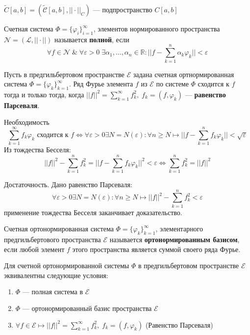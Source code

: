 $ \tilde{C}[a,b] = (\tilde{\mathcal{C}}[a,b], ||\cdot||_C) $ --- подпространство $ C[a,b] $
\begin{greyDefinition} Счетная система  $ \Phi = \{ \varphi_i\}^\infty_{i=1} $, элементов нормированного пространства $ \mathcal{N} = (\mathcal{L},||\cdot||)  $ называется \textbf{полной}, если 
\[
	\forall f \in \mathcal{N}\; \& \;\forall \varepsilon>0\; \exists\alpha_1,\ldots,\alpha_n \in \mathbb{R}: ||f-\sum_{k=1}^n \alpha_k\varphi_k || <\varepsilon
\]
\end{greyDefinition}
\begin{greyTheorem}
	Пусть в предгильбертовом пространстве $ \mathcal{E} $ задана счетная ортнормированная система $ \Phi = \{ \varphi_k \}^\infty_{k=1} $. Ряд Фурье элемента $ f $ из $ \mathcal{E} $ по системе $ \Phi $ сходится к $ f $ тогда и только тогда, когда $ ||f||^2 = \sum_{k=1}^\infty f_k^2,\; f_k = (f,\varphi_k) $ --- \textbf{равенство Парсеваля}.
\end{greyTheorem}
\begin{greyProof}
	Необходимость\[
		\sum_{k=1}^\infty f_k\varphi_k \text{ сходится к } f \Leftrightarrow \forall \varepsilon>0 \exists N=N(\varepsilon): \forall n \geqslant N \mapsto ||f-\sum_{k=1}^n f_k\varphi_k || < \sqrt{\varepsilon}
	\]
	Из тождества Бесселя:
		\[
	||f||^2 - \sum_{k=1}^n f_k^2 = ||f-\sum_{k=1}^n f_k\varphi_k||^2<\varepsilon \Leftrightarrow \sum_{k=1}^nf_k^2 = ||f||^2
	\]
\end{greyProof}
\begin{greyEmpty}
		Достаточность. Дано равенство Парсеваля:
	\[
	\forall \varepsilon>0 \exists N = N(\varepsilon): \forall n \geqslant N \mapsto ||f||^2 - \sum_{k=1}^n f_k^2 < \varepsilon
	\]
	применение тождества Бесселя заканчивает доказательство.
\end{greyEmpty}
\begin{greyDefinition} Счетная ортонормированная система $ \Phi = \{ \varphi_k\}^\infty_{k=1} $, элементарного предгильбертового пространства $ \mathcal{E} $ называется \textbf{ортонормированным базисом}, если любой элемент $ f $ этого пространства является суммой своего ряда Фурье.
\end{greyDefinition}
\begin{greyTheorem}
	Для счетной ортонормированной системы $ \Phi $ в предгильбертовом пространстве $ \mathcal{E} $ эквивалентны следующие условия:
	\begin{enumerate}
		\item $ \Phi $ --- полная система в $ \mathcal{E} $
		\item $ \Phi $ --- ортонормированный базис пространства $ \mathcal{E} $
		\item $ \forall f \in \mathcal{E} \mapsto ||f||^2 = \sum_{k=1}^\infty f_k^2,\; f_k = (f,\varphi_k)$ (Равенство Парсеваля)
 	\end{enumerate}
\end{greyTheorem}
